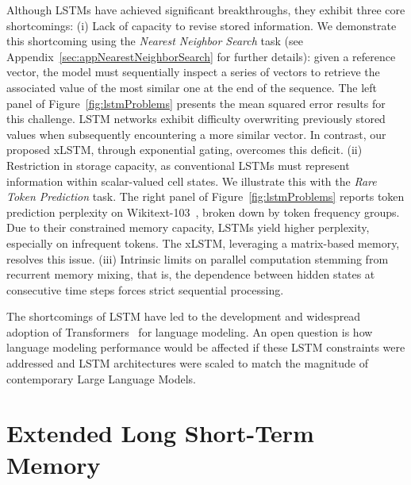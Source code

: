 Although LSTMs have achieved significant breakthroughs, they exhibit three core shortcomings: (i) Lack of capacity to revise stored information. We demonstrate this shortcoming using the {\it Nearest Neighbor Search} task (see Appendix~\ref{sec:appNearestNeighborSearch} for further details): given a reference vector, the model must sequentially inspect a series of vectors to retrieve the associated value of the most similar one at the end of the sequence. The left panel of Figure~\ref{fig:lstmProblems} presents the mean squared error results for this challenge. LSTM networks exhibit difficulty overwriting previously stored values when subsequently encountering a more similar vector. In contrast, our proposed xLSTM, through exponential gating, overcomes this deficit. (ii) Restriction in storage capacity, as conventional LSTMs must represent information within scalar-valued cell states. We illustrate this with the {\it Rare Token Prediction} task. The right panel of Figure~\ref{fig:lstmProblems} reports token prediction perplexity on Wikitext-103~\citep{Merity:17}, broken down by token frequency groups. Due to their constrained memory capacity, LSTMs yield higher perplexity, especially on infrequent tokens. The xLSTM, leveraging a matrix-based memory, resolves this issue. (iii) Intrinsic limits on parallel computation stemming from recurrent memory mixing, that is, the dependence between hidden states at consecutive time steps forces strict sequential processing.

The shortcomings of LSTM have led to the development and widespread adoption of Transformers~\citep{Vaswani:17} for language modeling. An open question is how language modeling performance would be affected if these LSTM constraints were addressed and LSTM architectures were scaled to match the magnitude of contemporary Large Language Models.

\section{Extended Long Short-Term Memory}
\label{sec:xLSTM}

